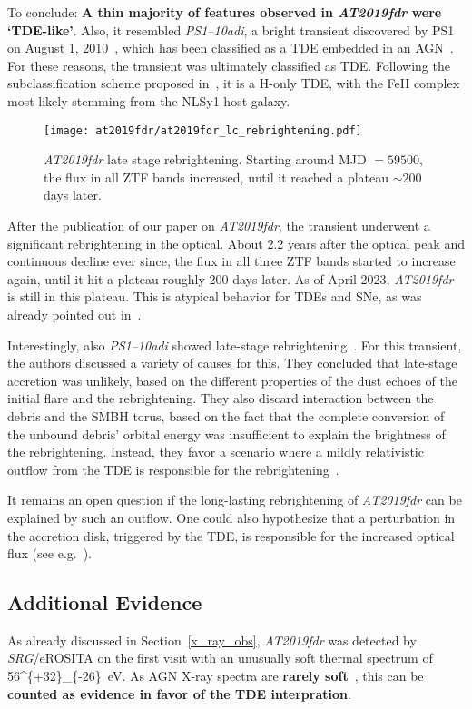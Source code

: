 To conclude: \textbf{A thin majority of features observed in \emph{AT2019fdr} were `TDE-like'}. Also, it resembled \emph{PS1--10adi}, a bright transient discovered by PS1 on August 1, 2010~, which has been classified as a TDE embedded in an AGN~. For these reasons, the transient was ultimately classified as TDE. Following the subclassification scheme proposed in~, it is a H-only TDE, with the FeII complex most likely stemming from the NLSy1 host galaxy.

\begin{figure}[htb]
    \texttt{[image: at2019fdr/at2019fdr\_lc\_rebrightening.pdf]}
    \caption[\emph{AT2019fdr} rebrightening]{\emph{AT2019fdr} late stage rebrightening. Starting around MJD $=59500$, the flux in all ZTF bands increased, until it reached a plateau $\sim 200$ days later.}
\end{figure}

After the publication of our paper on \emph{AT2019fdr}, the transient underwent a significant rebrightening in the optical. About 2.2 years after the optical peak and continuous decline ever since, the flux in all three ZTF bands started to increase again, until it hit a plateau roughly 200 days later. As of April 2023, \emph{AT2019fdr} is still in this plateau. This is atypical behavior for TDEs and SNe, as was already pointed out in~\cite{Frederick2021}.

Interestingly, also \emph{PS1--10adi} showed late-stage rebrightening~\cite{Jiang2019}. For this transient, the authors discussed a variety of causes for this. They concluded that late-stage accretion was unlikely, based on the different properties of the dust echoes of the initial flare and the rebrightening. They also discard interaction between the debris and the SMBH torus, based on the fact that the complete conversion of the unbound debris' orbital energy was insufficient to explain the brightness of the rebrightening. Instead, they favor a scenario where a mildly relativistic outflow from the TDE is responsible for the rebrightening~\cite{Jiang2019}.

It remains an open question if the long-lasting rebrightening of \emph{AT2019fdr} can be explained by such an outflow. One could also hypothesize that a perturbation in the accretion disk, triggered by the TDE, is responsible for the increased optical flux (see e.g.~).

\subsection{Additional Evidence}
As already discussed in Section~\ref{x_ray_obs}, \emph{AT2019fdr} was detected by \textit{SRG}/eROSITA on the first visit with an unusually soft thermal spectrum of \SI[parse-numbers = false]{56^{+32}_{-26}}{\eV}. As AGN X-ray spectra are \textbf{rarely soft}~, this can be \textbf{counted as evidence in favor of the TDE interpration}.

